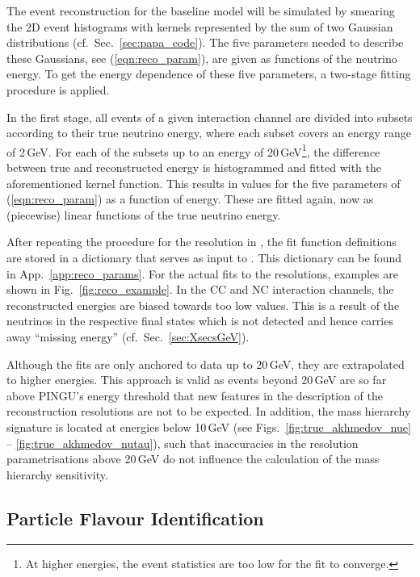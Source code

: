 The event reconstruction for the baseline model will be simulated by smearing
the 2D event histograms with kernels represented by the sum of two Gaussian
distributions (cf.~Sec.~\ref{sec:papa_code}). The five parameters needed to
describe these Gaussians, see (\ref{eqn:reco_param}), are given as functions of
the neutrino energy. To get the energy dependence of these five parameters, a
two-stage fitting procedure is applied. 

In the first stage, all events of a given interaction channel are divided into
subsets according to their true neutrino energy, where each subset covers an
energy range of 2\,GeV. For each of the subsets up to an energy of
20\,GeV\footnote{At higher energies, the event statistics are too low for the
fit to converge.}, the difference between true and reconstructed energy is
histogrammed and fitted with the aforementioned kernel function. This results in
values for the five parameters of (\ref{eqn:reco_param}) as a function of
energy. These are fitted again, now as (piecewise) linear functions of the true
neutrino energy.

After repeating the procedure for the resolution in \coszen, the fit function
definitions are stored in a dictionary that serves as input to \papa. This
dictionary can be found in App.~\ref{app:reco_params}. For the actual fits to
the resolutions, examples are shown in Fig.~\ref{fig:reco_example}. In the
\nutau CC and \nux NC interaction channels, the reconstructed energies are
biased towards too low values. This is a result of the neutrinos in the
respective final states which is not detected and hence carries away
``missing energy'' (cf.~Sec.~\ref{sec:XsecsGeV}).

Although the fits are only anchored to data up to 20\,GeV, they are extrapolated
to higher energies. This approach is valid as events beyond 20\,GeV are so far
above PINGU's energy threshold that new features in the description of the
reconstruction resolutions are not to be expected. In addition, the mass
hierarchy signature is located at energies below 10\,GeV (see
Figs.~\ref{fig:true_akhmedov_nue} -- \ref{fig:true_akhmedov_nutau}), such that
inaccuracies in the resolution parametrisations above 20\,GeV do not influence
the calculation of the mass hierarchy sensitivity.

\subsection{Particle Flavour Identification}
\label{sec:input_pid}

